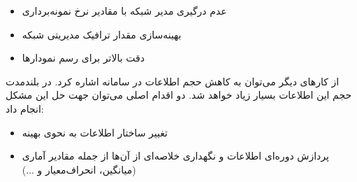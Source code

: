 \begin{itemize}
    \item عدم درگیری مدیر شبکه با مقادیر نرخ نمونه‌برداری
    \item بهینه‌سازی مقدار ترافیک مدیریتی شبکه
    \item دقت بالاتر برای رسم نمودارها
\end{itemize}


از کارهای دیگر می‌توان به کاهش حجم اطلاعات در سامانه اشاره کرد. در بلندمدت حجم این اطلاعات بسیار زیاد خواهد شد. دو اقدام اصلی می‌توان جهت حل این مشکل انجام داد:

\begin{itemize}
    \item تغییر ساختار اطلاعات به نحوی بهینه
    \item پردازش دوره‌ای اطلاعات و نگهداری خلاصه‌ای از آن‌ها از جمله مقادیر آماری (میانگین، انحراف‌معیار و ...)
\end{itemize}